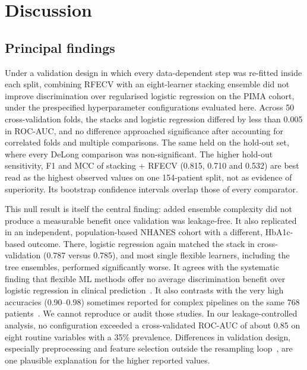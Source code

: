 \section{Discussion}
\label{sec:discussion}

\subsection{Principal findings}
Under a validation design in which every data-dependent step was re-fitted inside each split, combining RFECV with an eight-learner stacking ensemble did not improve discrimination over regularised logistic regression on the PIMA cohort, under the prespecified hyperparameter configurations evaluated here. Across 50 cross-validation folds, the stacks and logistic regression differed by less than 0.005 in ROC-AUC, and no difference approached significance after accounting for correlated folds and multiple comparisons. The same held on the hold-out set, where every DeLong comparison was non-significant. The higher hold-out sensitivity, F1 and MCC of stacking + RFECV (0.815, 0.710 and 0.532) are best read as the highest observed values on one 154-patient split, not as evidence of superiority. Its bootstrap confidence intervals overlap those of every comparator.

This null result is itself the central finding: added ensemble complexity did not produce a measurable benefit once validation was leakage-free. It also replicated in an independent, population-based NHANES cohort with a different, HbA1c-based outcome. There, logistic regression again matched the stack in cross-validation (0.787 versus 0.785), and most single flexible learners, including the tree ensembles, performed significantly worse. It agrees with the systematic finding that flexible ML methods offer no average discrimination benefit over logistic regression in clinical prediction~\cite{christodoulou2019}. It also contrasts with the very high accuracies (0.90--0.98) sometimes reported for complex pipelines on the same 768 patients~\cite{zhou2023boruta,shams2025rfegru}. We cannot reproduce or audit those studies. In our leakage-controlled analysis, no configuration exceeded a cross-validated ROC-AUC of about 0.85 on eight routine variables with a 35\% prevalence. Differences in validation design, especially preprocessing and feature selection outside the resampling loop~\cite{ambroise2002selection,kapoor2023leakage}, are one plausible explanation for the higher reported values.

